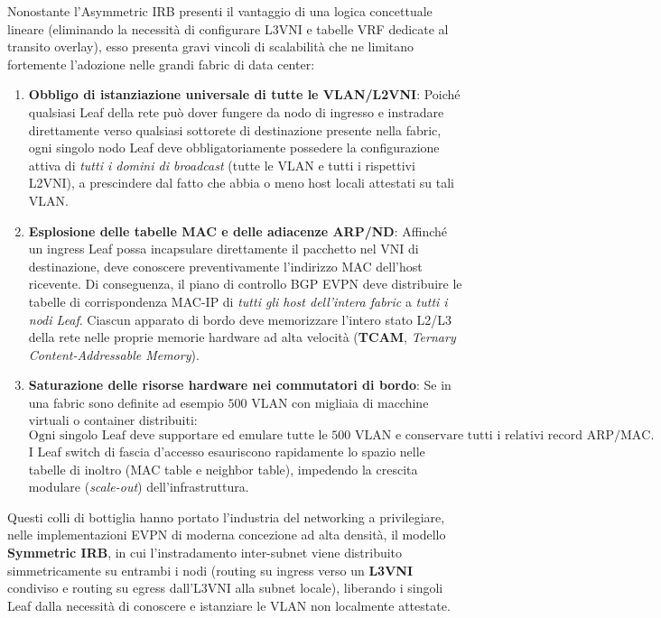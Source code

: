 \documentclass[11pt, a4paper]{article}
\begin{document}
Nonostante l'Asymmetric IRB presenti il vantaggio di una logica concettuale lineare (eliminando la necessità di configurare L3VNI e tabelle VRF dedicate al transito overlay), esso presenta gravi vincoli di scalabilità che ne limitano fortemente l'adozione nelle grandi fabric di data center:

\begin{enumerate}
    \item \textbf{Obbligo di istanziazione universale di tutte le VLAN/L2VNI}:
    Poiché qualsiasi Leaf della rete può dover fungere da nodo di ingresso e instradare direttamente verso qualsiasi sottorete di destinazione presente nella fabric, ogni singolo nodo Leaf deve obbligatoriamente possedere la configurazione attiva di \emph{tutti i domini di broadcast} (tutte le VLAN e tutti i rispettivi L2VNI), a prescindere dal fatto che abbia o meno host locali attestati su tali VLAN.

    \item \textbf{Esplosione delle tabelle MAC e delle adiacenze ARP/ND}:
    Affinché un ingress Leaf possa incapsulare direttamente il pacchetto nel VNI di destinazione, deve conoscere preventivamente l'indirizzo MAC dell'host ricevente. Di conseguenza, il piano di controllo BGP EVPN deve distribuire le tabelle di corrispondenza MAC-IP di \emph{tutti gli host dell'intera fabric} a \emph{tutti i nodi Leaf}. Ciascun apparato di bordo deve memorizzare l'intero stato L2/L3 della rete nelle proprie memorie hardware ad alta velocità (\textbf{TCAM}, \emph{Ternary Content-Addressable Memory}).

    \item \textbf{Saturazione delle risorse hardware nei commutatori di bordo}:
    Se in una fabric sono definite ad esempio $500$ VLAN con migliaia di macchine virtuali o container distribuiti:
    \[
    \text{Ogni singolo Leaf deve supportare ed emulare tutte le } 500 \text{ VLAN e conservare tutti i relativi record ARP/MAC.}
    \]
    I Leaf switch di fascia d'accesso esauriscono rapidamente lo spazio nelle tabelle di inoltro (MAC table e neighbor table), impedendo la crescita modulare (\emph{scale-out}) dell'infrastruttura.
\end{enumerate}

Questi colli di bottiglia hanno portato l'industria del networking a privilegiare, nelle implementazioni EVPN di moderna concezione ad alta densità, il modello \textbf{Symmetric IRB}, in cui l'instradamento inter-subnet viene distribuito simmetricamente su entrambi i nodi (routing su ingress verso un \textbf{L3VNI} condiviso e routing su egress dall'L3VNI alla subnet locale), liberando i singoli Leaf dalla necessità di conoscere e istanziare le VLAN non localmente attestate.
\end{document}
